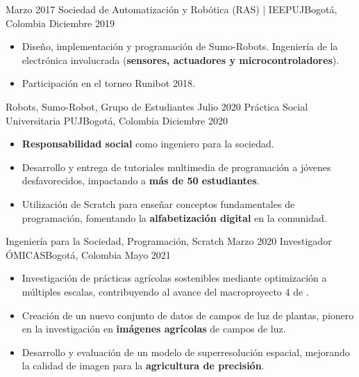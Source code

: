 %
%
%
\begin{experiences}
  \experience
    {Marzo 2017} {Sociedad de Automatización y Robótica (RAS) | IEE}{PUJ}{Bogotá, Colombia}
    {Diciembre 2019}    {
      \begin{itemize}
        \item Diseño, implementación y programación de Sumo-Robots. Ingeniería de la electrónica involucrada (\textbf{sensores, actuadores y microcontroladores}).
        \item Participación en el torneo Runibot 2018.
      \end{itemize}
    }
    {Robots, Sumo-Robot, Grupo de Estudiantes}  
  \emptySeparator
  \experience
    {Julio 2020}   {Práctica Social Universitaria} {PUJ}{Bogotá, Colombia}
    {Diciembre 2020}    {
      \begin{itemize}
        \item \textbf{Responsabilidad social} como ingeniero para la sociedad.
        \item Desarrollo y entrega de tutoriales multimedia de programación a jóvenes desfavorecidos, impactando a \textbf{más de 50 estudiantes}.
        \item Utilización de Scratch para enseñar conceptos fundamentales de programación, fomentando la \textbf{alfabetización digital} en la comunidad.
      \end{itemize}
    }
    {Ingeniería para la Sociedad, Programación, Scratch}
  \emptySeparator
  \experience
    {Marzo 2020}   {Investigador} {ÓMICAS}{Bogotá, Colombia}
    {Mayo 2021}    {
      \begin{itemize}
        \item Investigación de prácticas agrícolas sostenibles mediante optimización a múltiples escalas, contribuyendo al avance del macroproyecto 4 de \href{https://www.omicas.co/investigadores/juan-felipe-jaramillo-hernandez}{\color{CadetBlue}{ÓMICAS}}.
        \item Creación de un nuevo conjunto de datos de campos de luz de plantas, pionero en la investigación en \textbf{imágenes agrícolas} de campos de luz.
        \item Desarrollo y evaluación de un modelo de superresolución espacial, mejorando la calidad de imagen para la \textbf{agricultura de precisión}.

\end{itemize}}
\end{experiences}
